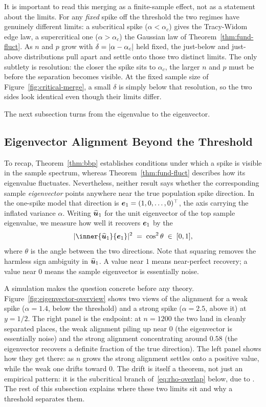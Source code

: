 It is important to read this merging as a finite-sample effect, not as a statement about the limits. For any \emph{fixed} spike off the threshold the two regimes have genuinely different limits: a subcritical spike (\(\alpha < \alpha_c\)) gives the Tracy-Widom edge law, a supercritical one (\(\alpha > \alpha_c\)) the Gaussian law of Theorem~\ref{thm:fund-fluct}. As \(n\) and \(p\) grow with \(\delta = \lvert\alpha - \alpha_c\rvert\) held fixed, the just-below and just-above distributions pull apart and settle onto those two distinct limits. The only subtlety is resolution: the closer the spike sits to \(\alpha_c\), the larger \(n\) and \(p\) must be before the separation becomes visible. At the fixed sample size of Figure~\ref{fig:critical-merge}, a small \(\delta\) is simply below that resolution, so the two sides look identical even though their limits differ.

The next subsection turns from the eigenvalue to the eigenvector.

\subsection{Eigenvector Alignment Beyond the Threshold}\label{subsec:eigenvector}

To recap, Theorem~\ref{thm:bbp} establishes conditions under which a spike is visible in the sample spectrum, whereas Theorem~\ref{thm:fund-fluct} describes how its eigenvalue fluctuates. Nevertheless, neither result says whether the corresponding sample \emph{eigenvector} points anywhere near the true population spike direction. In the one-spike model that direction is \(\bm{e}_1 = (1, 0, \dots, 0)^{\top}\), the axis carrying the inflated variance \(\alpha\). Writing \(\widehat{\bm{u}}_1\) for the unit eigenvector of the top sample eigenvalue, we measure how well it recovers \(\bm{e}_1\) by the 
\[
  \abs{\inner{\widehat{\vect u}_1}{\vect e_1}}^2 \;=\; \cos^2 \theta \;\in\; [0, 1],
\]
where \(\theta\) is the angle between the two directions. Note that squaring removes the harmless sign ambiguity in \(\widehat{\bm{u}}_1\). A value near \(1\) means near-perfect recovery; a value near \(0\) means the sample eigenvector is essentially noise.

A simulation makes the question concrete before any theory. Figure~\ref{fig:eigenvector-overview} shows two views of the alignment for a weak spike (\(\alpha = 1.4\), below the threshold) and a strong spike (\(\alpha = 2.5\), above it) at \(y = 1/2\). The right panel is the endpoint: at \(n = 1200\) the two land in cleanly separated places, the weak alignment piling up near \(0\) (the eigenvector is essentially noise) and the strong alignment concentrating around \(0.58\) (the eigenvector recovers a definite fraction of the true direction). The left panel shows how they get there: as \(n\) grows the strong alignment settles onto a positive value, while the weak one drifts toward \(0\). The drift is itself a theorem, not just an empirical pattern: it is the subcritical branch of~\eqref{eq:rho-overlap} below, due to \citet{Paul2007}. The rest of this subsection explains where these two limits sit and why a threshold separates them.

